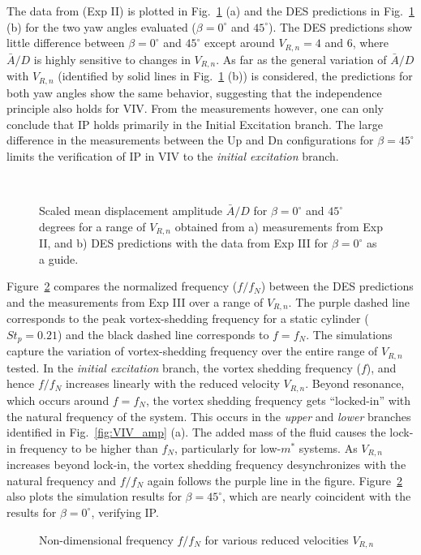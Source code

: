 The data from \citet{franzini2013one} (Exp II) is plotted in
Fig.~\ref{fig:VIV_yaw} (a) and the DES predictions in Fig.~\ref{fig:VIV_yaw}
(b) for the two yaw angles evaluated ($\beta=0^\circ$ and $45^\circ$). The DES
predictions show little difference between $\beta=0^\circ$ and $45^\circ$
except around $V_{R,n}=4$ and $6$, where $\bar{A}/D$ is highly sensitive to
changes in $V_{R,n}$. As far as the general variation of $\bar{A}/D$ with
$V_{R,n}$ (identified by solid lines in Fig.~\ref{fig:VIV_yaw} (b)) is
considered, the predictions for both yaw angles show the same behavior,
suggesting that the independence principle also holds for VIV. From the
measurements however, one can only conclude that IP holds primarily in the
Initial Excitation branch. The large difference in the measurements between the
Up and Dn configurations for $\beta=45^\circ$ limits the verification of IP in
VIV to the {\em initial excitation}
branch.
%
\begin{figure}[htb!]
  \qquad
     {} \\
  \caption{Scaled mean displacement amplitude $\bar{A}/D$ for $\beta=0^\circ$
    and $45^\circ$ degrees for a range of $V_{R,n}$ obtained from a) measurements
    from Exp II, and b) DES predictions with the data from Exp III for
    $\beta=0^\circ$ as a guide.}
  \label{fig:VIV_yaw}
\end{figure}

Figure~\ref{fig:VIV_freq} compares the normalized frequency ($f/f_N$) between
the DES predictions and the measurements from Exp III over a range of
$V_{R,n}$. The purple dashed line corresponds to the peak vortex-shedding
frequency for a static cylinder ($St_p=0.21$) and the black dashed line
corresponds to $f=f_N$. The simulations capture the variation of
vortex-shedding frequency over the entire range of $V_{R,n}$ tested. In the
{\em initial excitation} branch, the vortex shedding frequency ($f$), and hence
$f/f_N$ increases linearly with the reduced velocity $V_{R,n}$. Beyond
resonance, which occurs around $f=f_N$, the vortex shedding frequency gets
``locked-in'' with the natural frequency of the system.  This occurs in the
{\em upper} and {\em lower} branches identified in Fig.~\ref{fig:VIV_amp} (a).
The added mass of the fluid causes the lock-in frequency to be higher than
$f_N$, particularly for low-$m^*$ systems. As $V_{R,n}$ increases beyond
lock-in, the vortex shedding frequency desynchronizes with the natural
frequency and $f/f_N$ again follows the purple line in the figure.
Figure~\ref{fig:VIV_freq} also plots the simulation results for
$\beta=45^\circ$, which are nearly coincident with the results for
$\beta=0^\circ$, verifying IP.
%
\begin{figure}[htb!]
  \caption{Non-dimensional frequency $f/f_N$ for various reduced velocities
    $V_{R,n}$}
  \label{fig:VIV_freq}
\end{figure}
